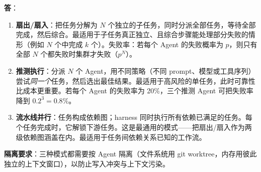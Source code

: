 \begin{questionbox}
\textbf{答}：

\begin{enumerate}
  \item \textbf{扇出/扇入}：把任务分解为 $N$ 个独立的子任务，同时分派全部任务，等待全部完成，然后综合。最适用于子任务真正独立、且综合步骤能处理部分失败的情形（例如 $N$ 个中完成 $k$ 个）。失败率：若每个 Agent 的失败概率为 $p$，则只有全部 $N$ 个都失败时集群才失败（$p^N$）。

  \item \textbf{推测执行}：分派 $N$ 个 Agent，用不同策略（不同 prompt、模型或工具序列）尝试\emph{同一个}任务，然后选出最佳结果。最适用于高风险的单任务，此时可靠性比成本更重要。若每个 Agent 的失败率为 20\%，三个推测 Agent 可把失败率降到 $0.2^3 = 0.8\%$。

  \item \textbf{流水线并行}：任务构成依赖图；harness 同时执行所有依赖已满足的任务。每个任务完成时，它解锁下游任务。这是最通用的模式——把扇出/扇入作为两级依赖图涵盖在内。最适用于任务间依赖关系已知的工作流。
\end{enumerate}

\textbf{隔离要求}：三种模式都需要按 Agent 隔离（文件系统用 git worktree，内存用彼此独立的上下文窗口），以防止写入冲突与上下文污染。


\end{questionbox}
